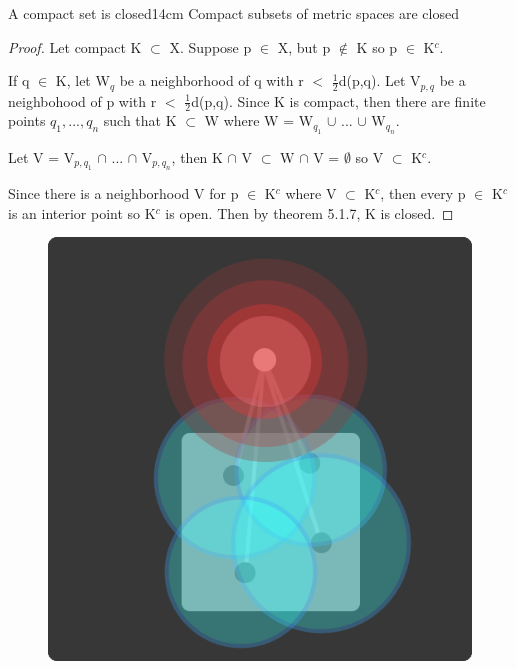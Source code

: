	\newpage



	\begin{wtheorem}{A compact set is closed}{14cm}
		Compact subsets of metric spaces are closed
	\end{wtheorem}
	
	\begin{proof}
		Let compact K $\subset$ X.
		Suppose p $\in$ X, but p $\not \in$ K so p $\in$ K$^c$.

		If q $\in$ K, let W$_q$ be a neighborhood of q with
		r $<$ $\frac{1}{2}$d(p,q).
		Let V$_{p,q}$ be a neighbohood of p with r $<$ $\frac{1}{2}$d(p,q).
		Since K is compact, then there are finite points $q_1, ... , q_n$
		such that K $\subset$ W where W = W$_{q_1}$ $\cup$ ... $\cup$ W$_{q_n}$.

		Let V = V$_{p,q_1}$ $\cap$ ... $\cap$ V$_{p,q_n}$, then
		K $\cap$ V $\subset$ W $\cap$ V = $\emptyset$ so V $\subset$ K$^c$.

		Since there is a neighborhood V for p $\in$ K$^c$ where V $\subset$ K$^c$,
		then every p $\in$ K$^c$ is an interior point so K$^c$ is open.
		Then by {\color{red} theorem 5.1.7}, K is closed.	
	\end{proof}



	\begin{figure}[h]
		\centering
		\includegraphics[scale=0.35]{Images/6.3.4.png}
	\end{figure}



